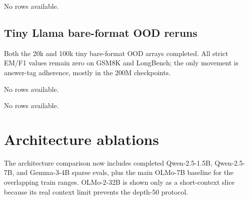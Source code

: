 \documentclass[10pt]{article}
\begin{document}
\begin{table}[H]
\centering
\small
No rows available.
\caption{Tiny Llama OOD F1 metrics after strict answer extraction. GSM8K is omitted because it is scored by numeric exact match.}
\end{table}

\subsection{Tiny Llama bare-format OOD reruns}
Both the 20k and 100k tiny bare-format OOD arrays completed. All strict EM/F1 values remain zero on GSM8K and LongBench; the only movement is answer-tag adherence, mostly in the 200M checkpoints.

\begin{table}[H]
\centering
\small
No rows available.
\caption{Tiny Llama 20k bare-format OOD exact-match metrics.}
\end{table}

\begin{table}[H]
\centering
\small
No rows available.
\caption{Tiny Llama 100k bare-format OOD exact-match metrics.}
\end{table}

\section{Architecture ablations}
The architecture comparison now includes completed Qwen-2.5-1.5B, Qwen-2.5-7B, and Gemma-3-4B sparse evals, plus the main OLMo-7B baseline for the overlapping train ranges. OLMo-2-32B is shown only as a short-context slice because its real context limit prevents the depth-50 protocol.
\end{document}
